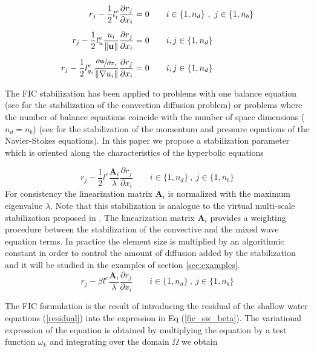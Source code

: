 \documentclass[a4paper,12pt]{article}
\newcommand{\pder}[2]{\frac{\partial#1}{\partial#2}}
\newcommand{\norm}[1]{\lVert#1\rVert}
\begin{document}
\begin{subequations}
\begin{align}
r_j - \frac{1}{2}l^e_i\pder{r_j}{x_i} &= 0
    \qquad i\in\{1,n_d\} \ ,\ j\in\{1,n_b\}\\[5pt]
r_j - \frac{1}{2}l^e_u\frac{u_i}{\norm{\mathbf{u}}}\pder{r_j}{x_i} &= 0
    \qquad i,j\in\{1,n_d\}\\[5pt]
r_j - \frac{1}{2}l^e_{g_i}\frac{\sfrac{\partial\mathbf{u}}{\partial x_i}}{\norm{\nabla u_i}}\pder{r_j}{x_i} &= 0
    \qquad i,j\in\{1,n_d\}
\end{align}
\end{subequations}

The FIC stabilization has been applied to problems with one balance equation (see \cite{onate1998} for the stabilization of the convection diffusion problem) or problems where the number of balance equations coincide with the number of space dimensions ($n_d = n_b$) (see \cite{onate1998} for the stabilization of the momentum and pressure equations of the Navier-Stokes equations). In this paper we propose a stabilization parameter which is oriented along the characteristics of the hyperbolic equations

\begin{equation} \label{fic_sw}
r_j - \frac{1}{2}l^e\frac{\mathbf{A}_i}{\lambda}\pder{r_j}{x_i}
    \qquad i\in\{1,n_d\} \ ,\ j\in\{1,n_b\}
\end{equation}
For consistency the linearization matrix $\mathbf{A}_i$ is normalized with the maximum eigenvalue $\lambda$. Note that this stabilization is analogue to the virtual multi-scale stabilization proposed in \cite{codina2008b}. The linearization matrix $\mathbf{A}_i$ provides a weighting procedure between the stabilization of the convective and the mixed wave equation terms. In practice the element size is multiplied by an algorithmic constant in order to control the amount of diffusion added by the stabilization and it will be studied in the examples of section \ref{sec:examples}.
\begin{equation} \label{fic_sw_beta}
r_j - \beta l^e\frac{\mathbf{A}_i}{\lambda}\pder{r_j}{x_i}
    \qquad i\in\{1,n_d\} \ ,\ j\in\{1,n_b\}
\end{equation}

The FIC formulation is the result of introducing the residual of the shallow water equations (\ref{residual}) into the expression in Eq (\ref{fic_sw_beta}). The variational expression of the equation is obtained by multiplying the equation by a test function $\omega_k$ and integrating over the domain $\Omega$ we obtain
\end{document}
